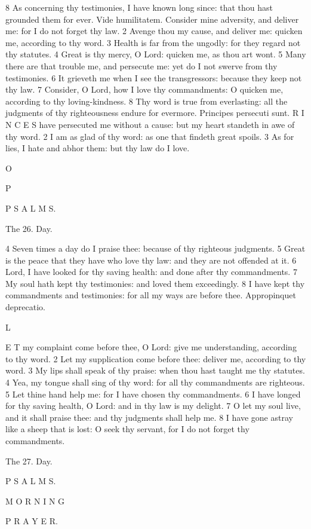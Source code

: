 8 As concerning thy testimonies, I have known long since: that thou hast grounded them for ever. Vide humilitatem. Consider mine adversity, and deliver me: for I do not forget thy law. 2 Avenge thou my cause, and deliver me: quicken me, according to thy word. 3 Health is far from the ungodly: for they regard not thy statutes. 4 Great is thy mercy, O Lord: quicken me, as thou art wont. 5 Many there are that trouble me, and persecute me: yet do I not swerve from thy testimonies. 6 It grieveth me when I see the transgressors: because they keep not thy law. 7 Consider, O Lord, how I love thy commandments: O quicken me, according to thy loving-kindness. 8 Thy word is true from everlasting: all the judgments of thy righteousness endure for evermore. Principes persecuti sunt. R I N C E S have persecuted me without a cause: but my heart standeth in awe of thy word. 2 I am as glad of thy word: as one that findeth great spoils. 3 As for lies, I hate and abhor them: but thy law do I love.

O

P

P S A L M S.

The 26. Day.

4 Seven times a day do I praise thee: because of thy righteous judgments. 5 Great is the peace that they have who love thy law: and they are not offended at it. 6 Lord, I have looked for thy saving health: and done after thy commandments. 7 My soul hath kept thy testimonies: and loved them exceedingly. 8 I have kept thy commandments and testimonies: for all my ways are before thee. Appropinquet deprecatio.

L

E T my complaint come before thee, O Lord: give me understanding, according to thy word. 2 Let my supplication come before thee: deliver me, according to thy word. 3 My lips shall speak of thy praise: when thou hast taught me thy statutes. 4 Yea, my tongue shall sing of thy word: for all thy commandments are righteous. 5 Let thine hand help me: for I have chosen thy commandments. 6 I have longed for thy saving health, O Lord: and in thy law is my delight. 7 O let my soul live, and it shall praise thee: and thy judgments shall help me. 8 I have gone astray like a sheep that is lost: O seek thy servant, for I do not forget thy commandments.

The 27. Day.

P S A L M S.

M O R N I N G

P R A Y E R.

